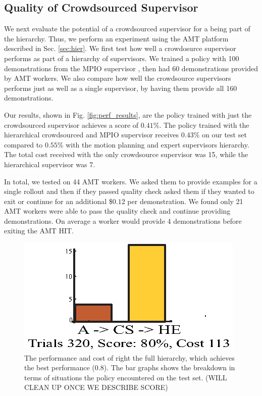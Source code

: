 \documentclass[10pt, conference]{ieeeconf}      %
\begin{document}
\subsection{Quality of Crowdsourced Supervisor}
We next evaluate the potential of a  crowdsourced supervisor for a being part of the hierarchy. Thus, we perform an experiment using the AMT platform described in Sec. \ref{sec:hier}. We  first test how well a crowdosurce supervisor performs as part of a hierarchy of supervisors. We trained a policy with 100  demonstrations  from the MPIO supervisor , then had 60 demonstrations provided by AMT workers. We also compare how well the crowdsource supervisors performs just as well as a single supervisor,  by having them provide all 160 demonstrations.

Our results, shown in Fig. \ref{fig:perf_results}, are the policy trained with just the crowdsourced supervisor achieves a score of $0.41\%$. The policy trained with the hierarchical crowdsourced and MPIO supervisor receives $0.43\%$ on our test set compared to $0.55\%$ with the motion planning and expert supervisors hierarchy. The total cost received with the only crowdsource supervisor was 15, while the hierarchical supervisor was 7. 

In total, we tested on 44 AMT workers. We asked them to provide examples for a single rollout and then if they passed quality check asked them if they wanted to exit or continue for an additional \$$0.12$ per demonstration. We found only 21 AMT workers were able to pass the quality check and continue providing demonstrations. On average a worker would provide 4 demonstrations before exiting the AMT HIT. 


\begin{figure}[t]
\includegraphics{f_figs/big_data.eps}
\centering 
\caption{ \footnotesize The performance and cost of right the full hierarchy, which achieves the best performance (0.8). The bar graphs shows the breakdown in terms of situations the policy encountered on the test set.  (WILL CLEAN UP ONCE WE DESCRIBE SCORE)   }
\vspace*{-20pt}
\label{fig:big_data}
\end{figure}
\end{document}

